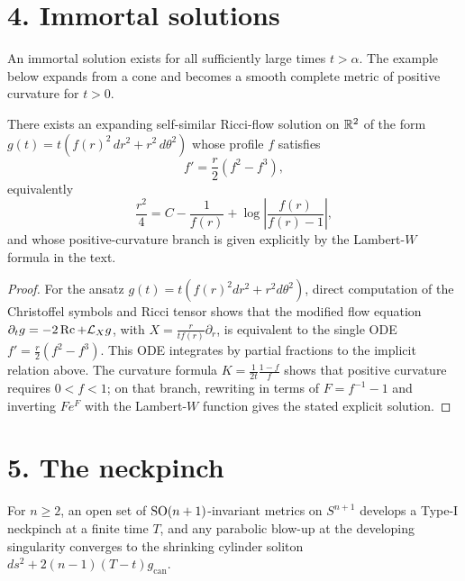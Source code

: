 \section*{4. Immortal solutions}

An immortal solution exists for all sufficiently large times \(t>\alpha\). The
example below expands from a cone and becomes a smooth complete metric of
positive curvature for \(t>0\).

\begin{lemma}
\label{ch02-lem-expanding-cone-soliton}
There exists an expanding self-similar Ricci-flow solution on \(\mathbb{R}^2\) of the
form \(g(t)=t(f(r)^2\,dr^2+r^2\,d\theta^2)\) whose profile \(f\) satisfies
\[
f'=\frac r2(f^2-f^3),
\]
equivalently
\[
\frac{r^2}{4}=C-\frac1{f(r)}+\log\left|\frac{f(r)}{f(r)-1}\right|,
\]
and whose positive-curvature branch is given explicitly by the Lambert-\(W\)
formula in the text.
\end{lemma}

\begin{proof}
For the ansatz \(g(t)=t(f(r)^2dr^2+r^2d\theta^2)\), direct computation of the
Christoffel symbols and Ricci tensor shows that the modified flow equation
\(\partial_t g=-2\operatorname{Rc}+\mathcal L_X g\), with
\(X=\frac{r}{tf(r)}\partial_r\), is equivalent to the single ODE
\(f'=\frac r2(f^2-f^3)\). This ODE integrates by partial fractions to the
implicit relation above. The curvature formula
\(K=\frac1{2t}\frac{1-f}{f}\) shows that positive curvature requires
\(0<f<1\); on that branch, rewriting in terms of \(F=f^{-1}-1\) and inverting
\(Fe^F\) with the Lambert-\(W\) function gives the stated explicit solution.
\end{proof}

\section*{5. The neckpinch}

\begin{theorem}
\label{ch02-thm-neckpinch-rigorous}
For \(n\ge 2\), an open set of \(\mathrm{SO}(n+1)\)-invariant metrics on \(S^{n+1}\)
develops a Type-I neckpinch at a finite time \(T\), and any parabolic blow-up
at the developing singularity converges to the shrinking cylinder soliton
\(ds^2+2(n-1)(T-t)g_{\mathrm{can}}\).
\end{theorem}


